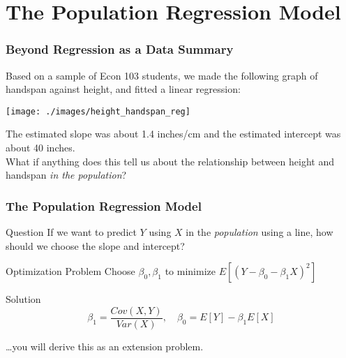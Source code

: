 \section{The Population Regression Model}
\begin{frame}
\frametitle{Beyond Regression as a Data Summary}
\small
Based on a sample of Econ 103 students, we made the following graph of handspan against height, and fitted a linear regression:
\begin{center}
\texttt{[image: ./images/height\_handspan\_reg]}
\end{center}
The estimated slope was about 1.4 inches/cm and the estimated intercept was about 40 inches. \\


\alert{What if anything does this tell us about the relationship between height and handspan \emph{in the population}?}
\end{frame}
\begin{frame}
	\frametitle{The Population Regression Model}

  \begin{block}{Question}
    If we want to predict $Y$ using $X$ in the \emph{population} using a line, how should we choose the slope and intercept?
\end{block}

\begin{block}{Optimization Problem}
  Choose $\beta_0,\beta_1$ to minimize $E[(Y - \beta_0 - \beta_1 X)^2]$
\end{block}

\begin{alertblock}{Solution}
  \vspace{-1em}
  \[
    \beta_1 = \frac{Cov(X,Y)}{Var(X)}, \quad \beta_0 = E[Y] - \beta_1 E[X]
  \]
\end{alertblock}

\alert{\hfill\dots you will derive this as an extension problem.}

\end{frame}
